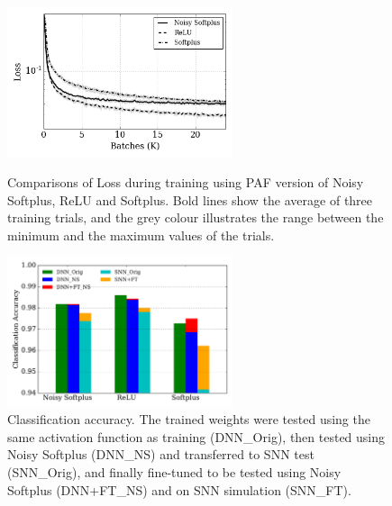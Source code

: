 \documentclass{article}
\begin{document}
	\begin{figure}
		\begin{minipage}[t]{0.48\linewidth}
			\raggedleft
			\includegraphics[width=2.6in]{pics_iconip/8.png}
			\caption{Comparisons of Loss during training using PAF version of Noisy Softplus, ReLU and Softplus. Bold lines show the average of three training trials, and the grey colour illustrates the range between the minimum and the maximum values of the trials. }
			\label{Fig:loss_ns}
		\end{minipage}%
		\hspace{0.04\linewidth}
		\begin{minipage}[t]{0.48\linewidth}
			\raggedright
			\includegraphics[width=2.6in]{pics_iconip/9-2.pdf}
			\caption{Classification accuracy.
			The trained weights were tested using the same activation function as training (DNN\_Orig), then tested using Noisy Softplus (DNN\_NS) and transferred to SNN test (SNN\_Orig), and finally fine-tuned to be tested using Noisy Softplus (DNN+FT\_NS) and on SNN simulation (SNN\_FT).  }
			\label{Fig:result_bar}
		\end{minipage}
	\end{figure}
	
\end{document}
